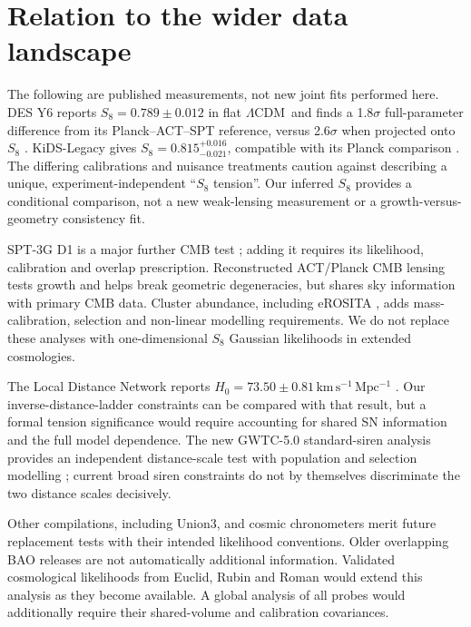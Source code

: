 \documentclass[fleqn,usenatbib]{mnras}
\newcommand{\lcdm}{$\Lambda$CDM}
\newcommand{\hunit}{\mathrm{km\,s^{-1}\,Mpc^{-1}}}
\begin{document}
\section{Relation to the wider data landscape}\label{sec:context}
The following are published measurements, not new joint fits performed here.
DES Y6 reports $S_8=0.789\pm0.012$ in flat \lcdm\ and finds a 1.8$\sigma$
full-parameter difference from its Planck--ACT--SPT reference, versus
2.6$\sigma$ when projected onto $S_8$ \citep{DESY6}. KiDS-Legacy gives
$S_8=0.815^{+0.016}_{-0.021}$, compatible with its Planck comparison
\citep{KiDS}. The differing calibrations and nuisance treatments caution
against describing a unique, experiment-independent ``$S_8$ tension''.
Our inferred $S_8$ provides a conditional comparison, not a new weak-lensing
measurement or a growth-versus-geometry consistency fit.

SPT-3G D1 is a major further CMB test \citep{SPT}; adding it requires its
likelihood, calibration and overlap prescription. Reconstructed ACT/Planck
CMB lensing \citep{Lensing} tests growth and helps break geometric degeneracies,
but shares sky information with primary CMB data. Cluster abundance, including
eROSITA \citep{eROSITA}, adds mass-calibration, selection and non-linear
modelling requirements. We do not replace these analyses with one-dimensional
$S_8$ Gaussian likelihoods in extended cosmologies.

The Local Distance Network reports
$H_0=73.50\pm0.81\,\hunit$ \citep{DistanceNetwork}. Our inverse-distance-ladder
constraints can be compared with that result, but a formal tension significance
would require accounting for shared SN information and the full model
dependence. The new GWTC-5.0 standard-siren analysis provides an independent
distance-scale test with population and selection modelling
\citep{GWTC5}; current broad siren constraints do not by themselves discriminate
the two distance scales decisively.

Other compilations, including Union3, and cosmic chronometers merit future
replacement tests with their intended likelihood conventions. Older overlapping
BAO releases are not automatically additional information. Validated cosmological likelihoods from Euclid, Rubin and Roman would extend
this analysis as they become available. A global analysis of all probes would additionally require their
shared-volume and calibration covariances.
\end{document}
